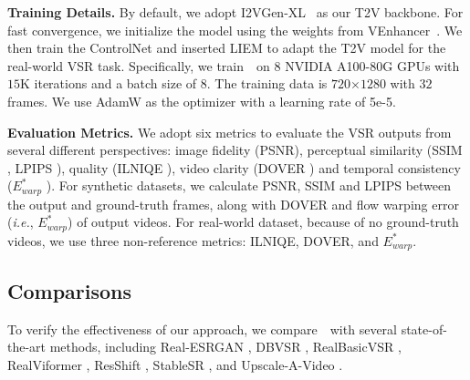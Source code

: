 \noindent
\textbf{Training Details.}
By default, we adopt I2VGen-XL~\cite{zhang2023i2vgen} as our T2V backbone.
For fast convergence, we initialize the model using the weights from VEnhancer~\cite{he2024venhancer}. We then train the ControlNet and inserted LIEM to adapt the T2V model for the real-world VSR task. Specifically, we train~\name~on $8$ NVIDIA A100-80G GPUs with $15$K iterations and a batch size of $8$. 
The training data is $720$$\times$$1280$ with $32$ frames. We use AdamW \cite{loshchilov2017decoupled} as the optimizer with a learning rate of 5e-5.

\noindent
\textbf{Evaluation Metrics.}
We adopt six metrics to evaluate the VSR outputs from several different perspectives: image fidelity (PSNR), perceptual similarity (SSIM \cite{wang2004image}, LPIPS \cite{zhang2018lpips}), quality (ILNIQE \cite{zhang2015ilniqe}), video clarity (DOVER \cite{wu2023dover}) and temporal consistency ($E^*_{warp}$ \cite{Lai2018warping, liu2024evalcrafter}). 
For synthetic datasets, we calculate PSNR, SSIM and LPIPS between the output and ground-truth frames, along with DOVER and flow warping error (\textit{i.e.}, $E^*_{warp}$) of output videos. For real-world dataset, because of no ground-truth videos, we use three non-reference metrics: ILNIQE, DOVER, and $E^*_{warp}$.
%

\subsection{Comparisons}
To verify the effectiveness of our approach, we compare~\name~with several state-of-the-art methods, including Real-ESRGAN \cite{wang2021realesrgan}, DBVSR \cite{pan2021deep}, RealBasicVSR \cite{chan2022investigating}, RealViformer \cite{zhang2024realviformer}, ResShift \cite{yue2024resshift}, StableSR \cite{wang2024exploiting}, and Upscale-A-Video \cite{zhou2024upscale}.


